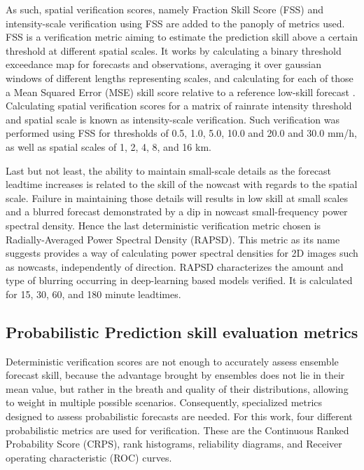 
As such, spatial verification scores, namely Fraction Skill Score (FSS) and intensity-scale verification using FSS are added to the panoply of metrics used. FSS is a verification metric aiming to estimate the prediction skill above a certain threshold at different spatial scales. It works by calculating a binary threshold exceedance map for forecasts and observations, averaging it over gaussian windows of different lengths representing scales, and calculating for each of those a Mean Squared Error (MSE) skill score relative to a reference low-skill forecast \cite{roberts_scale-selective_2008}. Calculating spatial verification scores for a matrix of rainrate intensity threshold and spatial scale is known as intensity-scale verification. Such verification was performed using FSS for thresholds of 0.5, 1.0, 5.0, 10.0 and 20.0 and 30.0 mm/h, as well as spatial scales of 1, 2, 4, 8, and 16 km. 

Last but not least, the ability to maintain small-scale details as the forecast leadtime increases is related to the skill of the nowcast with regards to the spatial scale. Failure in maintaining those details will results in low skill at small scales and a blurred forecast demonstrated by a dip in nowcast small-frequency power spectral density. Hence the last deterministic verification metric chosen is Radially-Averaged Power Spectral Density (RAPSD). This metric as its name suggests provides a way of calculating power spectral densities for 2D images such as nowcasts, independently of direction. RAPSD characterizes the amount and type of blurring occurring in deep-learning based models verified. It is calculated for 15, 30, 60, and 180 minute leadtimes.
 


\subsection{Probabilistic Prediction skill evaluation metrics}

Deterministic verification scores are not enough to accurately assess ensemble forecast skill, because the advantage brought by ensembles does not lie in their mean value, but rather in the breath and quality of their distributions, allowing to weight in multiple possible scenarios. Consequently, specialized metrics designed to assess probabilistic forecasts are needed. 
For this work, four different probabilistic metrics are used for verification. These are the Continuous Ranked Probability Score (CRPS), rank histograms, reliability diagrams, and Receiver operating characteristic (ROC) curves. 

